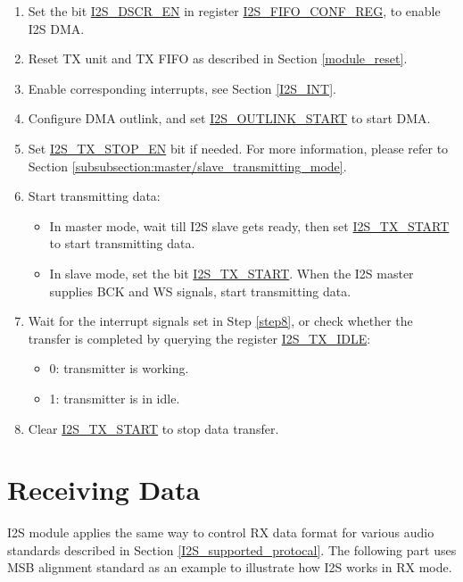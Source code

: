 \documentclass[main\_\_EN.tex]{subfiles}
\begin{document}
\begin{enumerate}
    \item Set the bit \hyperref[fielddesc:I2SDSCREN]{I2S\_DSCR\_EN} in register \hyperref[regdesc:I2SFIFOCONFREG]{I2S\_FIFO\_CONF\_REG}, to enable I2S DMA.
    \item Reset TX unit and TX FIFO as described in Section \ref{module_reset}.
    \item Enable corresponding interrupts, see Section \ref{I2S_INT}. \label{step8}
    \item Configure DMA outlink, and set \hyperref[fielddesc:I2SOUTLINKSTART]{I2S\_OUTLINK\_START} to start DMA.
    \item Set \hyperref[fielddesc:I2STXSTOPEN]{I2S\_TX\_STOP\_EN} bit if needed. For more information, please refer to Section \ref{subsubsection:master/slave_transmitting_mode}.
    \item Start transmitting data:
    \begin{itemize}
        \item In master mode, wait till I2S slave gets ready, then set \hyperref[fielddesc:I2STXSTART]{I2S\_TX\_START} to start transmitting data.
        \item In slave mode, set the bit \hyperref[fielddesc:I2STXSTART]{I2S\_TX\_START}. When the I2S master supplies BCK and WS signals, start transmitting data.
    \end{itemize}

    \item Wait for the interrupt signals set in Step \ref{step8}, or check whether the transfer is completed by querying the register \hyperref[fielddesc:I2STXIDLE]{I2S\_TX\_IDLE}:
    \begin{itemize}
        \item 0: transmitter is working.
        \item 1: transmitter is in idle.
    \end{itemize}

    \item Clear \hyperref[fielddesc:I2STXSTART]{I2S\_TX\_START} to stop data transfer.
\end{enumerate}


\section{Receiving Data}\label{RXCHAN}

I2S module applies the same way to control RX data format for various audio standards described in Section \ref{I2S_supported_protocal}. The following part uses MSB alignment standard as an example to illustrate how I2S works in RX mode.
\end{document}

